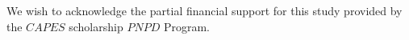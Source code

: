 We wish to acknowledge the partial financial support for this study provided by the $CAPES$ scholarship
$PNPD$ Program.